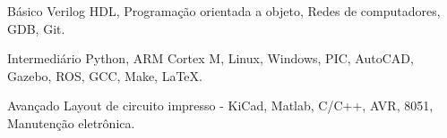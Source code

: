 

\begin{cvskills}

  \cvskill
    {Básico} %
    {Verilog HDL, Programação orientada a objeto, Redes de computadores, GDB, Git.} %

  \cvskill
    {Intermediário} %
    {Python, ARM Cortex M, Linux, Windows, PIC, AutoCAD, Gazebo, ROS, GCC, Make, LaTeX.} %

  \cvskill
    {Avançado} %
    {Layout de circuito impresso - KiCad, Matlab, C/C++, AVR, 8051, Manutenção eletrônica.} %

\end{cvskills}




